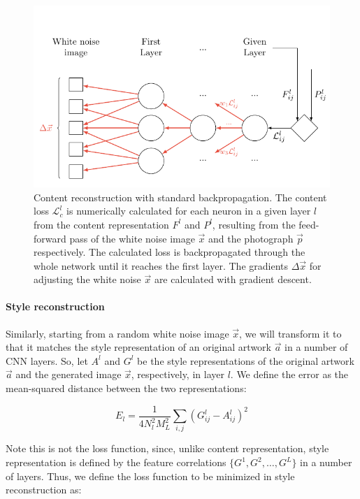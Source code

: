 \begin{figure}[t]
  \includegraphics[width=\textwidth]{tkz/feature-reconstruction}
  \caption{
    Content reconstruction with standard backpropagation.
    The content loss $\mathcal{L}^l_c$ is numerically calculated for each neuron in a given layer $l$ from the content representation $F^l$ and $P^l$, resulting from the feed-forward pass of the white noise image $\vec{x}$ and the photograph $\vec{p}$ respectively.
    The calculated loss is backpropagated through the whole network until it reaches the first layer.
    The gradients $\Delta \vec{x}$ for adjusting the white noise $\vec{x}$ are calculated with gradient descent.
  }
  \label{fig:system:method:feature-reconstruction}
\end{figure}

\paragraph{Style reconstruction}
Similarly, starting from a random white noise image $\vec{x}$, we will transform it to that it matches the style representation of an original artwork $\vec{a}$ in a number of CNN layers.
So, let $A^l$ and $G^l$ be the style representations of the original artwork $\vec{a}$ and the generated image $\vec{x}$, respectively, in layer $l$.
We define the error as the mean-squared distance between the two representations:

\begin{equation}
  E_l =
  \frac{1}{4 N^2_l M^2_L} \sum_{i,j} (G^l_{ij} - A^l_{ij})^2
\end{equation}

Note this is not the loss function, since, unlike content representation, style representation is defined by the feature correlations $\{G^1, G^2, \dots, G^L\}$ in a number of layers.
Thus, we define the loss function to be minimized in style reconstruction as:

